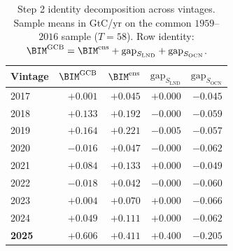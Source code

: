 \begin{table}[h]
  \centering
  \caption{Step 2 identity decomposition across vintages. Sample means in GtC/yr on the common $1959$--$2016$ sample ($T=58$). Row identity: $\BIM^{\mathrm{GCB}} = \BIM^{\mathrm{ens}} + \mathrm{gap}_{S_{\mathrm{LND}}} + \mathrm{gap}_{S_{\mathrm{OCN}}}$.}
  \label{tab:audit_step2_vintages}
  \begin{tabular}{lrrrr}
    \toprule
    Vintage & $\BIM^{\mathrm{GCB}}$ & $\BIM^{\mathrm{ens}}$ & $\mathrm{gap}_{S_{\mathrm{LND}}}$ & $\mathrm{gap}_{S_{\mathrm{OCN}}}$ \\
    \midrule
    2017 & $+0.001$ & $+0.045$ & $+0.000$ & $-0.045$ \\
    2018 & $+0.133$ & $+0.192$ & $-0.000$ & $-0.059$ \\
    2019 & $+0.164$ & $+0.221$ & $-0.005$ & $-0.057$ \\
    2020 & $-0.016$ & $+0.047$ & $-0.000$ & $-0.062$ \\
    2021 & $+0.084$ & $+0.133$ & $+0.000$ & $-0.049$ \\
    2022 & $-0.018$ & $+0.042$ & $-0.000$ & $-0.060$ \\
    2023 & $+0.004$ & $+0.070$ & $+0.000$ & $-0.066$ \\
    2024 & $+0.049$ & $+0.111$ & $+0.000$ & $-0.062$ \\
    \bfseries{}2025 & $\mathbf{+0.606}$ & $\mathbf{+0.411}$ & $\mathbf{+0.400}$ & $\mathbf{-0.205}$ \\
    \bottomrule
  \end{tabular}
\end{table}

